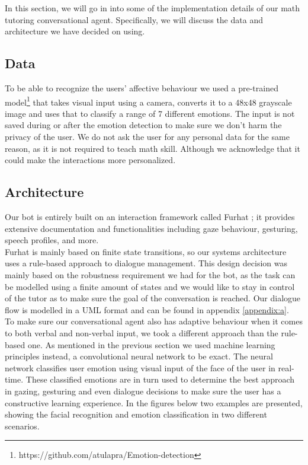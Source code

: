 In this section, we will go in into some of the implementation details of our math tutoring conversational agent. Specifically, we will discuss the data and architecture we have decided on using.

\subsection{Data}
\label{Data}
To be able to recognize the users' affective behaviour we used a pre-trained model\footnote{https://github.com/atulapra/Emotion-detection} that takes visual input using a camera, converts it to a 48x48 grayscale image and uses that to classify a range of 7 different emotions. The input is not saved during or after the emotion detection to make sure we don't harm the privacy of the user. We do not ask the user for any personal data for the same reason, as it is not required to teach math skill. Although we acknowledge that it could make the interactions more personalized.

\subsection{Architecture}
\label{Architecture}
Our bot is entirely built on an interaction framework called Furhat \cite{Furhat}; it provides extensive documentation and functionalities including gaze behaviour, gesturing, speech profiles, and more.\\

\noindent Furhat is mainly based on finite state transitions, so our systems architecture uses a rule-based approach to dialogue management. This design decision was mainly based on the robustness requirement we had for the bot, as the task can be modelled using a finite amount of states and we would like to stay in control of the tutor as to make sure the goal of the conversation is reached. Our dialogue flow is modelled in a UML format and can be found in appendix \ref{appendix:a}.\\

\noindent To make sure our conversational agent also has adaptive behaviour when it comes to both verbal and non-verbal input, we took a different approach than the rule-based one. As mentioned in the previous section we used machine learning principles instead, a convolutional neural network to be exact. The neural network classifies user emotion using visual input of the face of the user in real-time. These classified emotions are in turn used to determine the best approach in gazing, gesturing and even dialogue decisions to make sure the user has a constructive learning experience. In the figures below two examples are presented, showing the facial recognition and emotion classification in two different scenarios.

